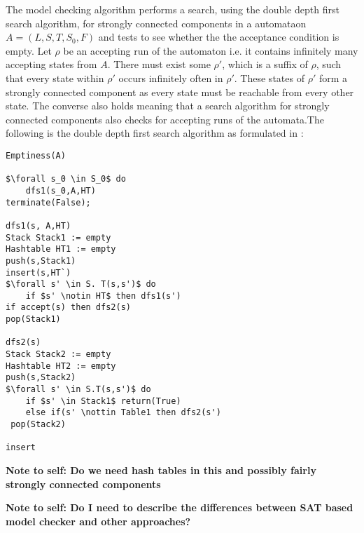 The model checking algorithm performs a search, using the double depth first search algorithm, for strongly connected components in a \Buchi automataon $A = (L,S,T, S_0, F)$ and tests to see whether the the acceptance condition is empty. Let $\rho$ be an accepting run of the automaton i.e. it contains infinitely many accepting states from $A$.  There must exist some $\rho'$, which is a suffix of $\rho$, such that every state within $\rho'$ occurs infinitely often in $\rho'$. These states of $\rho'$ form a strongly connected component as every state must be reachable from every other state. The converse also holds meaning that a search algorithm for strongly connected components also checks for accepting runs of the automata.The following is the double depth first search algorithm as formulated in \cite{EMC99}:

\begin{lstlisting}[caption = The double depth first search algorithm, mathescape]
Emptiness(A)

$\forall s_0 \in S_0$ do
	dfs1(s_0,A,HT)
terminate(False);

dfs1(s, A,HT)
Stack Stack1 := empty
Hashtable HT1 := empty
push(s,Stack1)
insert(s,HT`)
$\forall s' \in S. T(s,s')$ do
	if $s' \notin HT$ then dfs1(s')
if accept(s) then dfs2(s)
pop(Stack1)

dfs2(s)
Stack Stack2 := empty
Hashtable HT2 := empty
push(s,Stack2)
$\forall s' \in S.T(s,s')$ do
	if $s' \in Stack1$ return(True)
	else if(s' \nottin Table1 then dfs2(s')
 pop(Stack2)

insert

\end{lstlisting}

\textbf{Note to self: Do we need hash tables in this and possibly fairly strongly connected components}




\textbf{Note to self: Do I need to describe the differences between SAT based model checker and other approaches?}
